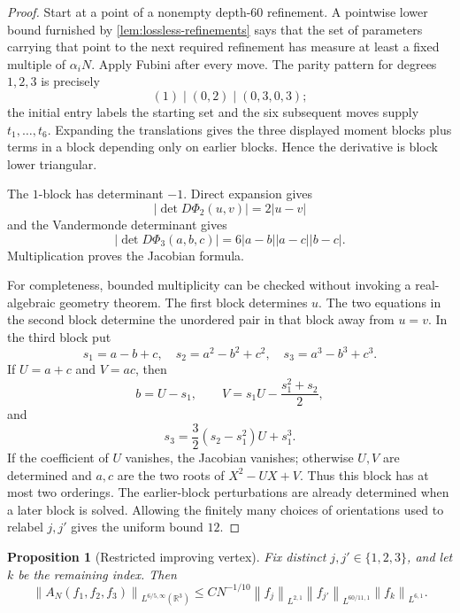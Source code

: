 \documentclass[11pt]{article}
\newtheorem{proposition}[theorem]{Proposition}
\newcommand{\R}{\mathbb{R}}
\newcommand{\norm}[2]{\left\lVert #1\right\rVert_{#2}}
\newcommand{\abs}[1]{\left|#1\right|}
\newcommand{\indices}{\{1,2,3\}}
\begin{document}
	\begin{proof}
		Start at a point of a nonempty depth-\(60\) refinement.  A pointwise lower bound furnished by \cref{lem:lossless-refinements} says that the set of parameters carrying that point to the next required refinement has measure at least a fixed multiple of \(\alpha_iN\).  Apply Fubini after every move.  The parity pattern for degrees \(1,2,3\) is precisely
		\[
		(1)\mid(0,2)\mid(0,3,0,3);
		\]
		the initial entry labels the starting set and the six subsequent moves supply
		\(t_1,\ldots,t_6\).  Expanding the translations gives the three displayed moment blocks plus terms in a block depending only on earlier blocks.  Hence the derivative is block lower triangular.
		
		The \(1\)-block has determinant \(-1\).  Direct expansion gives
		\[
		\abs{\det D\Phi_2(u,v)}=2\abs{u-v}
		\]
		and the Vandermonde determinant gives
		\[
		\abs{\det D\Phi_3(a,b,c)}
		=6\abs{a-b}\abs{a-c}\abs{b-c}.
		\]
		Multiplication proves the Jacobian formula.
		
		For completeness, bounded multiplicity can be checked without invoking a real-algebraic geometry theorem.  The first block determines \(u\).  The two equations in the second block determine the unordered pair in that block away from \(u=v\).  In the third block put
		\[
		s_1=a-b+c,\quad s_2=a^2-b^2+c^2,\quad
		s_3=a^3-b^3+c^3.
		\]
		If \(U=a+c\) and \(V=ac\), then
		\[
		b=U-s_1,\qquad
		V=s_1U-\frac{s_1^2+s_2}{2},
		\]
		and
		\[
		s_3=\frac32(s_2-s_1^2)U+s_1^3.
		\]
		If the coefficient of \(U\) vanishes, the Jacobian vanishes; otherwise \(U,V\) are determined and \(a,c\) are the two roots of
		\(X^2-UX+V\).  Thus this block has at most two orderings.  The earlier-block perturbations are already determined when a later block is solved.  Allowing the finitely many choices of orientations used to relabel \(j,j'\) gives the uniform bound \(12\).
	\end{proof}
	
	\begin{proposition}[Restricted improving vertex]\label{prop:restricted-improving-vertex}
		Fix distinct \(j,j'\in\indices\), and let \(k\) be the remaining index.  Then
		\[
		\norm{A_N(f_1,f_2,f_3)}{L^{6/5,\infty}(\R^3)}
		\leq C N^{-1/10}
		\norm{f_j}{L^{2,1}}
		\norm{f_{j'}}{L^{60/11,1}}
		\norm{f_k}{L^{6,1}}.
		\]
	\end{proposition}
	
\end{document}
